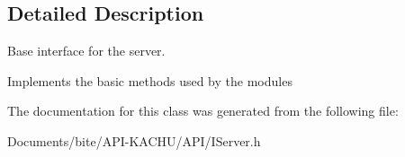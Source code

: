 \subsection{Detailed Description}
Base interface for the server. 

Implements the basic methods used by the modules 

The documentation for this class was generated from the following file\+:\begin{DoxyCompactItemize}
\item 
Documents/bite/\+A\+P\+I-\/\+K\+A\+C\+H\+U/\+A\+P\+I/I\+Server.\+h\end{DoxyCompactItemize}
